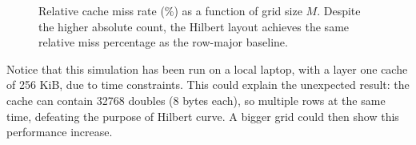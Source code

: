 \begin{figure}[h]
  \centering
  

  \caption{Relative cache miss rate (\%) as a function of grid size $M$.
    Despite the higher absolute count, the Hilbert layout achieves the same
  relative miss percentage as the row-major baseline.}
  \label{fig:cache_misses_relative}
\end{figure}

Notice that this simulation has been run on a local laptop, with a
layer one cache of
256 KiB, due to time constraints. This could explain the unexpected result:
the cache can contain 32768 doubles (8 bytes each), so multiple rows at the same
time, defeating
the purpose of Hilbert curve. A bigger grid could then show this
performance increase.